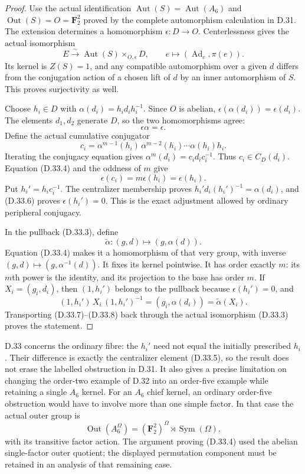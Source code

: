 \begin{proof}
Use the actual identification
$\operatorname{Aut}(S)=\operatorname{Aut}(A_6)$
and $\operatorname{Out}(S)=O=\mathbf F_2^2$
proved by the complete automorphism
calculation in D.31.
The extension determines a homomorphism
$\epsilon:D\to O$.
Centerlessness gives the actual isomorphism
\[
 E\xrightarrow{\sim}
       \operatorname{Aut}(S)\times_{O,\epsilon}D,
 \qquad e\longmapsto(\operatorname{Ad}_e,\pi(e)).
 \tag{D.33.3}
\]
Its kernel is $Z(S)=1$, and any compatible
automorphism over a given $d$ differs from
the conjugation action of a chosen lift
of $d$ by an inner automorphism of $S$.
This proves surjectivity as well.

Choose $h_i\in D$ with
$\alpha(d_i)=h_i d_i h_i^{-1}$.
Since $O$ is abelian,
$\epsilon(\alpha(d_i))=\epsilon(d_i)$.
The elements $d_1,d_2$ generate $D$,
so the two homomorphisms agree:
\[
                         \epsilon\alpha=\epsilon.
 \tag{D.33.4}
\]
Define the actual cumulative conjugator
\[
 c_i=\alpha^{m-1}(h_i)\,
          \alpha^{m-2}(h_i)\cdots\alpha(h_i)h_i.
 \tag{D.33.5}
\]
Iterating the conjugacy equation gives
$\alpha^m(d_i)=c_i d_i c_i^{-1}$.
Thus $c_i\in C_D(d_i)$.
Equation \textup{(D.33.4)} and the
oddness of $m$ give
\[
                 \epsilon(c_i)
                  =m\epsilon(h_i)=\epsilon(h_i).
 \tag{D.33.6}
\]
Put $h_i'=h_i c_i^{-1}$.
The centralizer membership proves
$h_i'd_i(h_i')^{-1}=\alpha(d_i)$,
and \textup{(D.33.6)} proves
$\epsilon(h_i')=0$.
This is the exact adjustment allowed
by ordinary peripheral conjugacy.

In the pullback \textup{(D.33.3)},
define
\[
 \widetilde\alpha:(g,d)\longmapsto(g,\alpha(d)).
 \tag{D.33.7}
\]
Equation \textup{(D.33.4)} makes it
a homomorphism of that very group,
with inverse $(g,d)\mapsto(g,\alpha^{-1}(d))$.
It fixes its kernel pointwise.
It has order exactly $m$: its
$m$th power is the identity, and
its projection to the base has
order $m$.
If $X_i=(g_i,d_i)$, then
$(1,h_i')$ belongs to the pullback
because $\epsilon(h_i')=0$, and
\[
 (1,h_i')\,X_i\,(1,h_i')^{-1}
     =(g_i,\alpha(d_i))
     =\widetilde\alpha(X_i).
 \tag{D.33.8}
\]
Transporting \textup{(D.33.7)--(D.33.8)}
back through the actual isomorphism
\textup{(D.33.3)} proves the statement.
\end{proof}

D.33 concerns the ordinary fibre:
the $h_i'$ need not equal the
initially prescribed $h_i$.
Their difference is exactly the
centralizer element
\textup{(D.33.5)}, so the result
does not erase the labelled
obstruction in D.31.
It also gives a precise limitation
on changing the order-two example
of D.32 into an order-five example
while retaining a single $A_6$
kernel.  For an $A_6$ chief kernel,
an ordinary order-five obstruction
would have to involve more than
one simple factor.
In that case the actual outer
group is
\[
       \operatorname{Out}(A_6^\Omega)
         =(\mathbf F_2^2)^\Omega
                         \rtimes\operatorname{Sym}(\Omega),
 \tag{D.33.9}
\]
with its transitive factor action.
The argument proving
\textup{(D.33.4)} used the abelian
single-factor outer quotient;
the displayed permutation
component must be retained in
an analysis of that remaining case.
